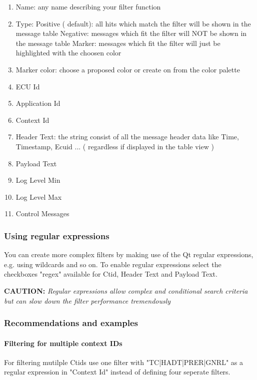 \documentclass[a4paper,11pt]{article}
\newcommand{\caution}[1]{\begin{ibox} \textbf{CAUTION:} \emph{#1} \end{ibox}}
\begin{document}
\begin{enumerate}
\item Name: any name describing your filter function
\item Type: \linebreak
      Positive ( default): all hits which match the filter will be shown in the message table\linebreak
      Negative: messages which fit the filter will NOT be shown in the message table\linebreak
      Marker: messages which fit the filter will just be highlighted with the choosen color\linebreak
\item Marker color: choose a proposed color or create on from the color palette
\item ECU Id
\item Application Id
\item Context Id
\item Header Text: the string consist of all the message header data like Time, Timestamp, Ecuid ...
      ( regardless if displayed in the table view )
\item Payload Text
\item Log Level Min
\item Log Level Max
\item Control Messages
\end{enumerate}


\subsubsection{Using regular expressions}
You can create more complex filters by making use of the Qt regular expressions, e.g. using wildcards and so on.
To enable regular expressions select the checkboxes "regex" available for Ctid, Header Text and Payload Text.

\caution{Regular expressions allow complex and conditional search criteria but can slow down the filter performance tremendously}

\subsubsection{Recommendations and examples}

\paragraph{Filtering for multiple context IDs}
For filtering mutilple Ctids use one filter with "TC|HADT|PRER|GNRL" as a regular expression in "Context Id" instead of defining four seperate filters.
\end{document}
